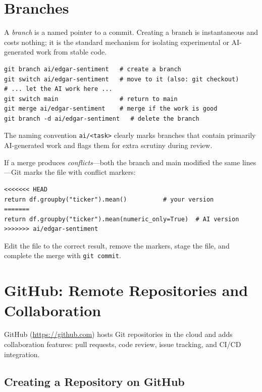 \section{Branches}
\label{app:git:branches}

A \emph{branch} is a named pointer to a commit.  Creating a branch is
instantaneous and costs nothing; it is the standard mechanism for isolating
experimental or AI-generated work from stable code.

\begin{verbatim}
git branch ai/edgar-sentiment   # create a branch
git switch ai/edgar-sentiment   # move to it (also: git checkout)
# ... let the AI work here ...
git switch main                 # return to main
git merge ai/edgar-sentiment    # merge if the work is good
git branch -d ai/edgar-sentiment   # delete the branch
\end{verbatim}

The naming convention \texttt{ai/<task>} clearly marks branches that contain
primarily AI-generated work and flags them for extra scrutiny during review.

If a merge produces \emph{conflicts}---both the branch and main modified the
same lines---Git marks the file with conflict markers:

\begin{verbatim}
<<<<<<< HEAD
return df.groupby("ticker").mean()          # your version
=======
return df.groupby("ticker").mean(numeric_only=True)  # AI version
>>>>>>> ai/edgar-sentiment
\end{verbatim}

Edit the file to the correct result, remove the markers, stage the file, and
complete the merge with \texttt{git commit}.

\section{GitHub: Remote Repositories and Collaboration}
\label{app:git:github}

GitHub (\url{https://github.com}) hosts Git repositories in the cloud and
adds collaboration features: pull requests, code review, issue tracking, and
CI/CD integration.

\subsection{Creating a Repository on GitHub}


